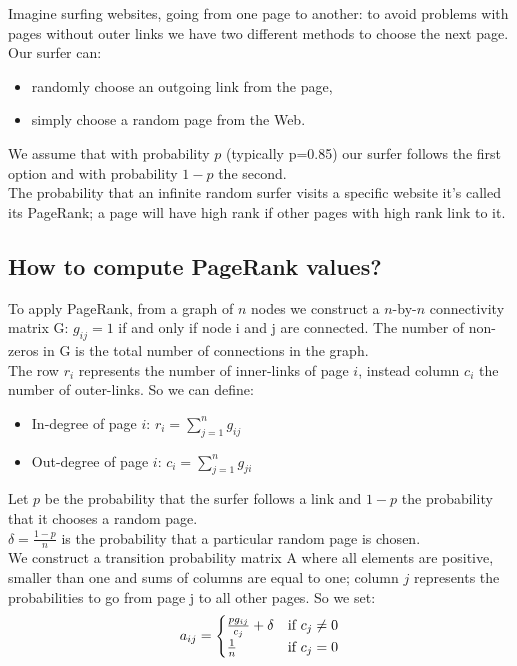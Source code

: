 \documentclass[12 pt]{article}
\newcommand\tab[1][1cm]{\hspace*{#1}}
\begin{document}
Imagine surfing websites, going from one page to another: to avoid problems with pages without outer links we have two different methods to choose the next page. Our surfer can:
\begin{itemize}
\item randomly choose an outgoing link from the page,
\item simply choose a random page from the Web.
\end{itemize}
We assume that with probability $p$ (typically p=0.85) our surfer follows the first option and with probability $1-p$ the second.\\
The probability that an infinite random surfer visits a specific website it's called its PageRank; a page will have high rank if other pages with high rank link to it.
\subsection{How to compute PageRank values?}
To apply PageRank, from a graph of $n$ nodes we construct a $n$-by-$n$ connectivity matrix G: $g_{ij}=1$ if and only if node i and j are connected. The number of non-zeros in G is the total number of connections in the graph.\\
The row $r_i$ represents the number of inner-links of page $i$, instead column $c_i$ the number of outer-links. So we can define:
\begin{itemize}
\item In-degree of page $i$: \tab $r_i = \sum\limits_{j=1}^{n} g_{ij}$
\item Out-degree of page $i$: \tab $c_i = \sum\limits_{j=1}^{n} g_{ji}$
\end{itemize}
Let $p$ be the probability that the surfer follows a link and $1-p$ the probability that it chooses a random page. \\
$\delta = \frac{1-p}{n}$ is the probability that a particular random page is chosen.\\
We construct a transition probability matrix A where all elements are positive, smaller than one and sums of columns are equal to one; column $j$ represents the probabilities to go from page j to all other pages. So we set:\\
\begin{equation}\notag
a_{ij} = 
\begin{cases}
\frac{pg_{ij}}{c_{j}} + \delta  & \text{if } c_{j} \neq 0\\
\frac{1}{n} & \text{if } c_{j} = 0
\end{cases}
\end{equation}
\end{document}
